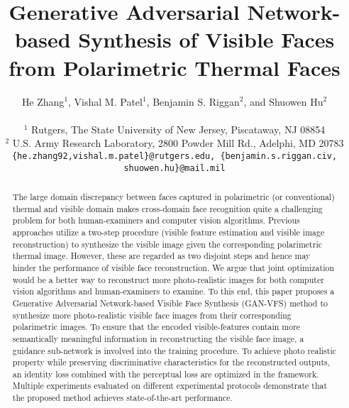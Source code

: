 \documentclass[10pt,twocolumn,letterpaper]{article}
\begin{document}
\title{Generative Adversarial Network-based Synthesis of Visible Faces from Polarimetric Thermal Faces}

\author{
He  Zhang$^1$, Vishal M. Patel$^1$, Benjamin S. Riggan$^2$, and Shuowen Hu$^2$\\
\\
$^1$ Rutgers, The State University of New Jersey, Piscataway, NJ 08854\\
$^2$ U.S. Army Research Laboratory, 2800 Powder Mill Rd., Adelphi, MD 20783
\\
{\tt\small {\{he.zhang92,vishal.m.patel\}}@rutgers.edu, \{benjamin.s.riggan.civ, shuowen.hu\}@mail.mil}
}

\maketitle
\thispagestyle{empty}

\begin{abstract}
The large domain discrepancy between faces captured in polarimetric (or conventional) thermal and visible domain makes cross-domain face recognition quite a challenging problem for both  human-examiners and computer vision algorithms. Previous approaches utilize a two-step procedure (visible feature estimation and  visible image reconstruction) to synthesize the visible image given the corresponding polarimetric thermal image. However, these  are regarded as two disjoint steps and hence may hinder the performance of visible face reconstruction. We argue that joint optimization would be a better way to reconstruct  more photo-realistic images for both computer vision algorithms and human-examiners to examine. To this end, this paper proposes a Generative Adversarial Network-based Visible Face Synthesis (GAN-VFS) method to synthesize more photo-realistic visible face images from their corresponding polarimetric images.  To ensure that the encoded visible-features contain more semantically meaningful information in reconstructing the visible face image, a guidance sub-network is involved into the training procedure. To achieve photo realistic  property while preserving discriminative characteristics for the reconstructed outputs, an identity loss combined with the perceptual loss are optimized in the framework. Multiple experiments evaluated on different experimental protocols demonstrate that the proposed method achieves state-of-the-art performance.  
\end{abstract}
\end{document}
